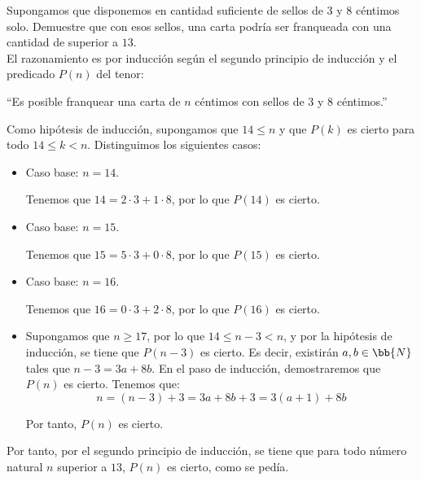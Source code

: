 \begin{ejercicio}
    Supongamos que disponemos en cantidad suficiente de sellos de 3 y 8 céntimos solo.
    Demuestre que con esos sellos, una carta podría ser franqueada con una cantidad de superior a $13$.\\

    El razonamiento es por inducción según el segundo principio de inducción y el predicado $P(n)$ del tenor:
    \begin{center}
        ``Es posible franquear una carta de $n$ céntimos con sellos de 3 y 8 céntimos.''
    \end{center}

    Como hipótesis de inducción, supongamos que $14\leq n$ y que $P(k)$ es cierto para todo $14\leq k<n$. Distinguimos
    los siguientes casos:
    \begin{itemize}
        \item Caso base: $n=14$.
        
        Tenemos que $14=2\cdot 3 +1\cdot 8$, por lo que $P(14)$ es cierto.

        \item Caso base: $n=15$.
        
        Tenemos que $15=5\cdot 3 + 0\cdot 8$, por lo que $P(15)$ es cierto.

        \item Caso base: $n=16$.
        
        Tenemos que $16=0\cdot 3 + 2\cdot 8$, por lo que $P(16)$ es cierto.
        
        \item Supongamos que $n\geq 17$, por lo que $14\leq n-3<n$, y por la hipótesis de inducción, se tiene que $P(n-3)$ es cierto.
        Es decir, existirán $a,b\in \bb{N}$ tales que $n-3 = 3a + 8b$.
        En el paso de inducción, demostraremos que $P(n)$ es cierto. Tenemos que:
        \begin{equation*}
            n = (n-3) + 3 = 3a + 8b + 3 = 3(a+1) + 8b
        \end{equation*}

        Por tanto, $P(n)$ es cierto.
    \end{itemize}

    Por tanto, por el segundo principio de inducción, se tiene que para todo número natural $n$ superior a $13$, $P(n)$ es cierto, como se pedía.
\end{ejercicio}

